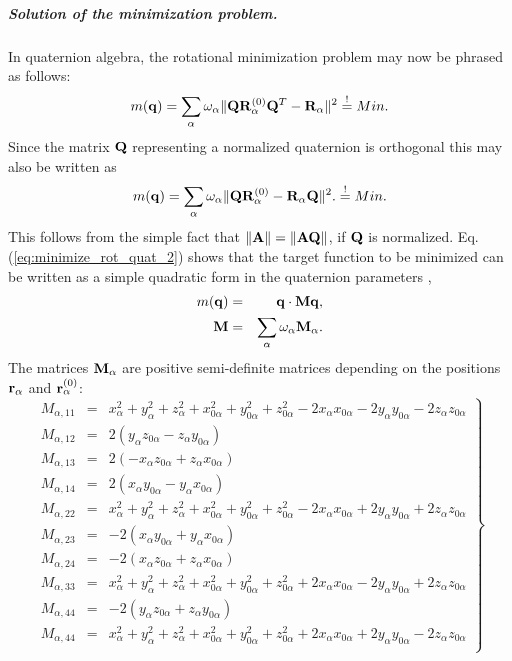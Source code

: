 \documentclass[a4paper,11pt]{article}
\begin{document}
\subparagraph{Solution of the minimization problem.} In quaternion algebra, the rotational minimization problem may now be 
phrased as follows:
\begin{equation}
\label{eq:minimize_rot_quat_1}
m({\bf q}) = \sum_\alpha \omega_\alpha 
\|{\bf Q}{\bf R}^{(0)}_\alpha{\bf Q}^T - {\bf R}_\alpha\|^2
\stackrel{!}{=} Min.
\end{equation}
Since the matrix ${\bf Q}$ representing a normalized quaternion is orthogonal this may also be written as
\begin{equation}
\label{eq:minimize_rot_quat_2}
m({\bf q}) = \sum_\alpha \omega_\alpha 
\|{\bf Q}{\bf R}^{(0)}_\alpha - {\bf R}_\alpha{\bf Q}\|^2.
\stackrel{!}{=} Min.
\end{equation}
This follows from the simple fact that  $\|{\bf A}\| = \|{\bf A}{\bf Q}\|$, if ${\bf Q}$ is normalized. 
Eq. (\ref{eq:minimize_rot_quat_2}) shows that the target function to be minimized can be written as a simple quadratic 
form in the quaternion parameters \cite{Kneller:1991}, \begin{eqnarray}
\label{eq:quad_form}
m({\bf q}) &= &{\bf q}\cdot{\bf M}{\bf q},\\
{\bf M} &= &\sum_\alpha \omega_\alpha {\bf M}_\alpha.
\end{eqnarray}
The matrices ${\bf M}_\alpha$ are positive semi-definite matrices depending on the positions ${\bf r}_\alpha$ and 
${\bf r}^{(0)}_\alpha$:
\begin{equation}
\left.
\begin{array}{lll}
M_{\alpha,11} &= &
  x_\alpha^2 + y_\alpha^2 + z_\alpha^2 
+ x_{0\alpha}^2 + y_{0\alpha}^2 + z_{0\alpha}^2   
-2x_\alpha x_{0\alpha} -2y_\alpha y_{0\alpha} -2z_\alpha z_{0\alpha}
\\
M_{\alpha,12} &= &2(y_\alpha z_{0\alpha} - z_\alpha y_{0\alpha})\\
M_{\alpha,13} &= &2(-x_\alpha z_{0\alpha} + z_\alpha x_{0\alpha})\\
M_{\alpha,14} &= &2(x_\alpha y_{0\alpha} - y_\alpha x_{0\alpha})\\
M_{\alpha,22} &= &
  x_\alpha^2 + y_\alpha^2 + z_\alpha^2 
+ x_{0\alpha}^2 + y_{0\alpha}^2 + z_{0\alpha}^2   
-2x_\alpha x_{0\alpha} +2y_\alpha y_{0\alpha} +2z_\alpha z_{0\alpha}
\\
M_{\alpha,23} &= &-2(x_\alpha y_{0\alpha} + y_\alpha x_{0\alpha})\\
M_{\alpha,24} &= &-2(x_\alpha z_{0\alpha} + z_\alpha x_{0\alpha})\\
M_{\alpha,33} &= &
  x_\alpha^2 + y_\alpha^2 + z_\alpha^2 
+ x_{0\alpha}^2 + y_{0\alpha}^2 + z_{0\alpha}^2   
+2x_\alpha x_{0\alpha} -2y_\alpha y_{0\alpha} +2z_\alpha z_{0\alpha}
\\
M_{\alpha,44} &= &-2(y_\alpha z_{0\alpha} + z_\alpha y_{0\alpha})\\
M_{\alpha,44} &= &
  x_\alpha^2 + y_\alpha^2 + z_\alpha^2 
+ x_{0\alpha}^2 + y_{0\alpha}^2 + z_{0\alpha}^2   
+2x_\alpha x_{0\alpha} +2y_\alpha y_{0\alpha} -2z_\alpha z_{0\alpha}
\\
\end{array}
\right\}
\end{equation}
\end{document}
